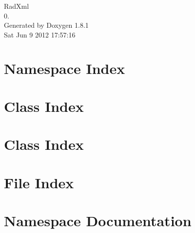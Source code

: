 \documentclass{book}
\begin{document}
\hypersetup{pageanchor=false,citecolor=blue}
\begin{titlepage}
\vspace*{7cm}
\begin{center}
{\Large Rad\-Xml \\[1ex]\large 0. }\\
\vspace*{1cm}
{\large Generated by Doxygen 1.8.1}\\
\vspace*{0.5cm}
{\small Sat Jun 9 2012 17:57:16}\\
\end{center}
\end{titlepage}
\clearemptydoublepage
{}
\tableofcontents
\clearemptydoublepage
{}
\hypersetup{pageanchor=true,citecolor=blue}
\chapter{Namespace Index}

\chapter{Class Index}

\chapter{Class Index}

\chapter{File Index}

\chapter{Namespace Documentation}

\end{document}
